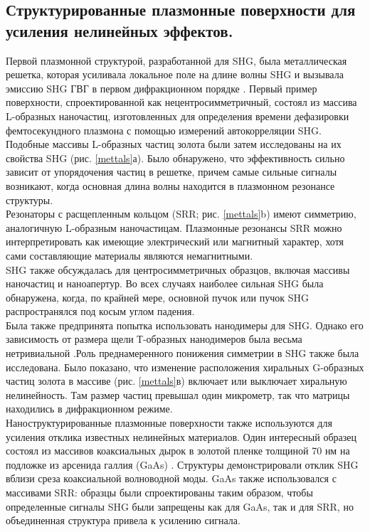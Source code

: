 \subsection*{Структурированные плазмонные поверхности для усиления нелинейных эффектов.}
\hspace*{2mm}
Первой плазмонной структурой, разработанной для SHG, была металлическая решетка, которая усиливала локальное поле на длине волны SHG и вызывала эмиссию SHG ГВГ в первом дифракционном порядке \cite{grosse2012nonlinear}. 
Первый пример поверхности, спроектированной как нецентросимметричный, состоял из массива L-образных наночастиц, изготовленных для определения времени дефазировки фемтосекундного плазмона с помощью измерений автокорреляции SHG. Подобные массивы L-образных частиц золота были затем исследованы на их свойства SHG (рис. \ref{mettals}а). Было обнаружено, что эффективность сильно зависит от упорядочения частиц в решетке, причем самые сильные сигналы возникают, когда основная длина волны находится в плазмонном резонансе структуры.
\\
\hspace*{2mm}
Резонаторы с расщепленным кольцом \cite{linden2012collective} (SRR; рис. \ref{mettals}b) имеют симметрию, аналогичную L-образным наночастицам. Плазмонные резонансы SRR можно интерпретировать как имеющие электрический или магнитный характер, хотя сами составляющие материалы являются немагнитными. 
\\
\hspace*{2mm}
SHG также обсуждалась для центросимметричных образцов, включая массивы наночастиц \cite{mcmahon2006second} и наноапертур. Во всех случаях наиболее сильная SHG была обнаружена, когда, по крайней мере, основной пучок или пучок SHG распространялся под косым углом падения.
\\
\hspace*{2mm}
Была также предпринята попытка использовать нанодимеры для SHG. Однако его зависимость от размера щели Т-образных нанодимеров была весьма нетривиальной \cite{canfield2007local}.Роль преднамеренного понижения симметрии в SHG также была исследована. Было показано, что изменение расположения хиральных G-образных частиц золота в массиве (рис. \ref{mettals}в) включает или выключает хиральную нелинейность. Там размер частиц превышал один микрометр, так что матрицы находились в дифракционном режиме. 
\\
\hspace*{2mm}
Наноструктурированные плазмонные поверхности также используются для усиления отклика известных нелинейных материалов. Один интересный образец состоял из массивов коаксиальных дырок в золотой пленке толщиной 70 нм на подложке из арсенида галлия (GaAs)  \cite{fan2006second}. Структуры демонстрировали отклик SHG вблизи среза коаксиальной волноводной моды. GaAs также использовался с массивами SRR: образцы были спроектированы таким образом, чтобы определенные сигналы SHG были запрещены как для GaAs, так и для SRR, но объединенная структура привела к усилению сигнала. 
